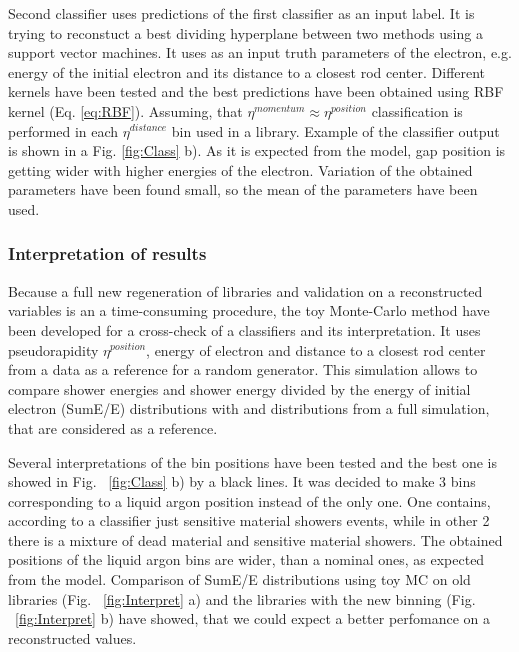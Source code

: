 Second classifier uses predictions of the first classifier as an input label. It is trying to reconstuct a best dividing hyperplane between two methods using a support vector machines. It uses as an input truth parameters of the electron, e.g. energy of the initial electron and its distance to a closest rod center. Different kernels have been tested and the best predictions have been obtained using RBF kernel (Eq. \ref{eq:RBF}).  Assuming, that $\eta^{momentum} \approx \eta^{position}$ classification is performed in each $\eta^{distance}$ bin used in a library. Example of the classifier output is shown in a Fig. \ref{fig:Class} b). As it is expected from the model, gap position is getting wider with higher energies of the electron.  Variation of the obtained parameters have been found small, so the mean of the parameters have been used.  

\subsubsection{Interpretation of results}

Because a full new regeneration of libraries and validation on a reconstructed variables is an a time-consuming procedure, the toy Monte-Carlo method have been developed for a cross-check of a classifiers and its interpretation. It uses pseudorapidity $\eta^{position}$, energy of electron and distance to a closest rod center from a data as a reference for a random generator. This simulation allows to compare shower energies and shower energy divided by  the energy of initial electron (SumE/E) distributions with and distributions from a full simulation, that are considered as a reference.

Several interpretations of the bin positions have been tested and the best one is showed in Fig. ~\ref{fig:Class} b) by a black lines. It was decided to make 3 bins corresponding to a liquid argon position instead of the only one. One contains, according to a classifier just sensitive material showers events, while in other 2 there is a mixture of dead material and sensitive material showers. The obtained positions of the liquid argon bins are wider, than a nominal ones, as expected from the model.
Comparison of SumE/E distributions using toy MC on old libraries (Fig. ~\ref{fig:Interpret} a) and the libraries with the new binning (Fig. ~\ref{fig:Interpret} b) have showed, that we could expect a better perfomance on a reconstructed values.


